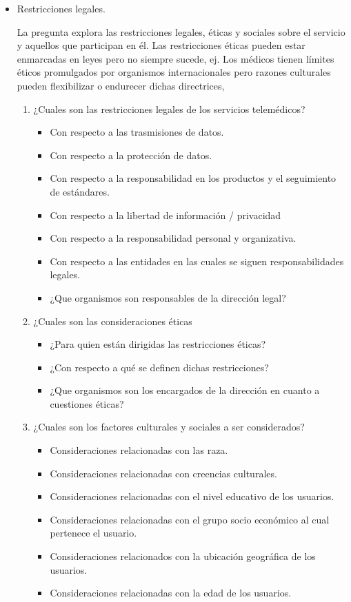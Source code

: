 \begin{itemize}
\item Restricciones legales. 

La pregunta explora las restricciones legales, éticas y sociales sobre el servicio y aquellos que participan en él. Las restricciones éticas pueden estar enmarcadas en leyes pero no siempre sucede, ej. Los médicos tienen límites éticos promulgados por organismos internacionales pero razones culturales pueden flexibilizar o endurecer dichas directrices,


\begin{enumerate}
\item ¿Cuales son las restricciones legales de los servicios telemédicos?

\begin{itemize}
\item Con respecto a las trasmisiones de datos. 
\item Con respecto a la protección de datos.
\item Con respecto a la responsabilidad en los productos y el seguimiento de estándares.
\item Con respecto a la libertad de información / privacidad 
\item Con respecto a la responsabilidad personal y organizativa. 
\item Con respecto a las entidades en las cuales se siguen responsabilidades legales. 
\item ¿Que organismos son responsables de la dirección legal? 
\end{itemize}

\item ¿Cuales son las consideraciones éticas

\begin{itemize}
\item ¿Para quien están dirigidas las restricciones éticas? 
\item ¿Con respecto a qué se definen dichas restricciones? 
\item ¿Que organismos son los encargados de la dirección en cuanto a cuestiones éticas?
\end{itemize}


\item ¿Cuales son los factores culturales y sociales a ser considerados?

\begin{itemize}
\item Consideraciones relacionadas con las raza. 
\item Consideraciones relacionadas con creencias culturales. 
\item Consideraciones relacionadas con el nivel educativo de los usuarios. 
\item Consideraciones relacionadas con el grupo socio económico al cual pertenece el usuario. 
\item Consideraciones relacionados con la ubicación geográfica de los usuarios. 
\item Consideraciones relacionadas con la edad de los usuarios.
\end{itemize}
\end{enumerate}


\end{itemize}
